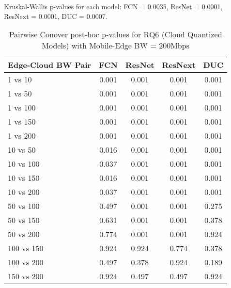 \begin{table}[h]
\centering
\caption{Pairwise Conover post-hoc p-values for RQ6 (Cloud Quantized Models) with Mobile-Edge BW = 200Mbps}
\label{tab:conover_cloud_quantized_me200}
\smallskip
Kruskal-Wallis p-values for each model: FCN = 0.0035, ResNet = 0.0001, ResNext = 0.0001, DUC = 0.0007.

\begin{tabular}{lcccc}
\toprule
Edge-Cloud BW Pair & FCN & ResNet & ResNext & DUC \\
\midrule
1 vs 10 & 0.001 & 0.001 & 0.001 & 0.001 \\
1 vs 50 & 0.001 & 0.001 & 0.001 & 0.001 \\
1 vs 100 & 0.001 & 0.001 & 0.001 & 0.001 \\
1 vs 150 & 0.001 & 0.001 & 0.001 & 0.001 \\
1 vs 200 & 0.001 & 0.001 & 0.001 & 0.001 \\
10 vs 50 & 0.016 & 0.001 & 0.001 & 0.001 \\
10 vs 100 & 0.037 & 0.001 & 0.001 & 0.001 \\
10 vs 150 & 0.016 & 0.001 & 0.001 & 0.001 \\
10 vs 200 & 0.037 & 0.001 & 0.001 & 0.001 \\
50 vs 100 & 0.497 & 0.001 & 0.001 & 0.275 \\
50 vs 150 & 0.631 & 0.001 & 0.001 & 0.378 \\
50 vs 200 & 0.774 & 0.001 & 0.001 & 0.924 \\
100 vs 150 & 0.924 & 0.924 & 0.774 & 0.378 \\
100 vs 200 & 0.497 & 0.378 & 0.924 & 0.189 \\
150 vs 200 & 0.924 & 0.497 & 0.497 & 0.924 \\
\bottomrule
\end{tabular}
\end{table}

